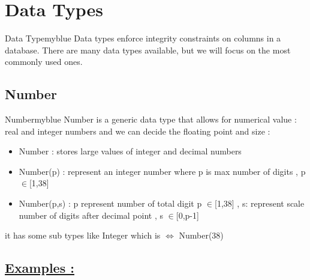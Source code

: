 \section{Data Types}


\begin{prettyBox}{Data Type}{myblue}
Data types enforce integrity constraints on columns in a database. There are many data types
available, but we will focus on the most commonly used ones.
\end{prettyBox}

\subsection{Number}

\begin{prettyBox}{Number}{myblue}
Number is a generic data type that allows for  numerical value : real and integer numbers 
and we can decide the floating point and size :
\begin{itemize}
    \item Number : stores large values of integer and decimal numbers 
    \item Number(p) : represent an integer number where p is max number of digits , p \(\in\)[1,38]
    \item Number(p,s) : p represent number of total digit p \(\in\)[1,38] , s: represent scale
number of digits after decimal point , s \(\in\)[0,p-1]
\end{itemize}

it has some sub types like Integer which is \(\Leftrightarrow\) Number(38)
\end{prettyBox}

\subsection*{\underline{Examples :}}

